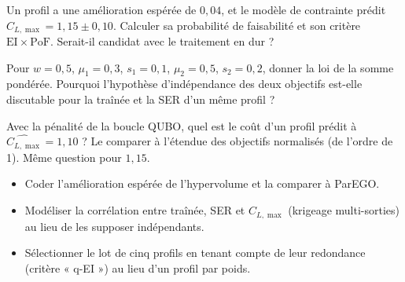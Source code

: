 \exercices
\begin{exercice}
Un profil a une amélioration espérée de $0{,}04$, et le modèle de contrainte prédit $C_{L,\max}=1{,}15\pm0{,}10$. Calculer sa probabilité de faisabilité et son critère $\mathrm{EI}\times\mathrm{PoF}$. Serait-il candidat avec le traitement en dur ?
\end{exercice}
\begin{exercice}
Pour $w=0{,}5$, $\mu_1=0{,}3$, $s_1=0{,}1$, $\mu_2=0{,}5$, $s_2=0{,}2$, donner la loi de la somme pondérée. Pourquoi l'hypothèse d'indépendance des deux objectifs est-elle discutable pour la traînée et la SER d'un même profil ?
\end{exercice}
\begin{exercice}
Avec la pénalité de la boucle QUBO, quel est le coût d'un profil prédit à $\widehat{C_{L,\max}}=1{,}10$ ? Le comparer à l'étendue des objectifs normalisés (de l'ordre de 1). Même question pour $1{,}15$.
\end{exercice}

\begin{pistes}
\begin{itemize}
\item Coder l'amélioration espérée de l'hypervolume et la comparer à ParEGO.
\item Modéliser la corrélation entre traînée, SER et $C_{L,\max}$ (krigeage multi-sorties) au lieu de les supposer indépendants.
\item Sélectionner le lot de cinq profils en tenant compte de leur redondance (critère « q-EI ») au lieu d'un profil par poids.
\end{itemize}
\end{pistes}
